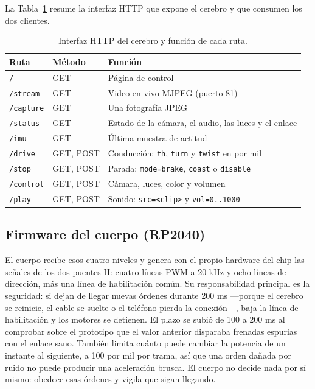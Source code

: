 \documentclass[journal]{IEEEtran}
\begin{document}
La Tabla~\ref{tab:api} resume la interfaz HTTP que expone el cerebro y que consumen los dos clientes.

\begin{table}[htbp]
\centering
\caption{Interfaz HTTP del cerebro y función de cada ruta.}
\label{tab:api}
\small
\begin{tabular}{@{}>{\raggedright\arraybackslash}p{2.4cm}>{\raggedright\arraybackslash}p{1.5cm}>{\raggedright\arraybackslash}p{3.8cm}@{}}
\toprule
\textbf{Ruta} & \textbf{Método} & \textbf{Función} \\
\midrule
\texttt{/} & GET & Página de control \\
\midrule
\texttt{/stream} & GET & Video en vivo MJPEG (puerto 81) \\
\midrule
\texttt{/capture} & GET & Una fotografía JPEG \\
\midrule
\texttt{/status} & GET & Estado de la cámara, el audio, las luces y el enlace \\
\midrule
\texttt{/imu} & GET & Última muestra de actitud \\
\midrule
\texttt{/drive} & GET, POST & Conducción: \texttt{th}, \texttt{turn} y \texttt{twist} en por mil \\
\midrule
\texttt{/stop} & GET, POST & Parada: \texttt{mode=brake}, \texttt{coast} o \texttt{disable} \\
\midrule
\texttt{/control} & GET, POST & Cámara, luces, color y volumen \\
\midrule
\texttt{/play} & GET, POST & Sonido: \texttt{src=<clip>} y \texttt{vol=0..1000} \\
\bottomrule
\end{tabular}
\end{table}

\subsection{Firmware del cuerpo (RP2040)}
El cuerpo recibe esos cuatro niveles y genera con el propio hardware del chip las señales de los dos puentes H: cuatro líneas PWM a 20 kHz y ocho líneas de dirección, más una línea de habilitación común. Su responsabilidad principal es la seguridad: si dejan de llegar nuevas órdenes durante 200 ms ---porque el cerebro se reinicie, el cable se suelte o el teléfono pierda la conexión---, baja la línea de habilitación y los motores se detienen. El plazo se subió de 100 a 200 ms al comprobar sobre el prototipo que el valor anterior disparaba frenadas espurias con el enlace sano. También limita cuánto puede cambiar la potencia de un instante al siguiente, a 100 por mil por trama, así que una orden dañada por ruido no puede producir una aceleración brusca. El cuerpo no decide nada por sí mismo: obedece esas órdenes y vigila que sigan llegando.
\end{document}
